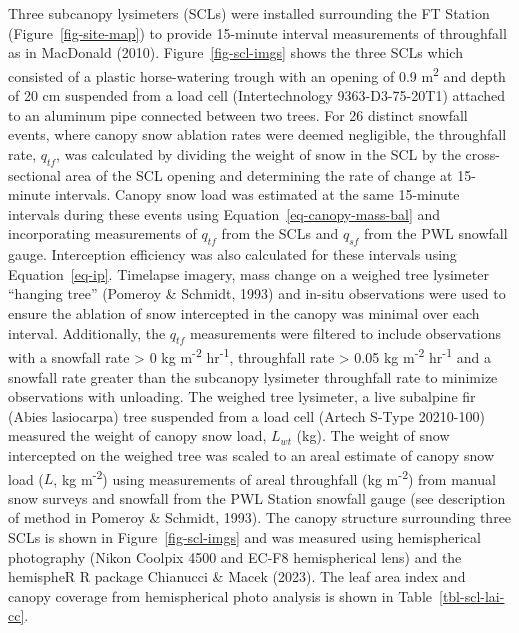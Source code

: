 \documentclass[
  letterpaper,
  DIV=11,
  numbers=noendperiod]{scrartcl}
\begin{document}
Three subcanopy lysimeters (SCLs) were installed surrounding the FT
Station (Figure~\ref{fig-site-map}) to provide 15-minute interval
measurements of throughfall as in MacDonald (2010).
Figure~\ref{fig-scl-imgs} shows the three SCLs which consisted of a
plastic horse-watering trough with an opening of 0.9
m\textsuperscript{2} and depth of 20 cm suspended from a load cell
(Intertechnology 9363-D3-75-20T1) attached to an aluminum pipe connected
between two trees. For 26 distinct snowfall events, where canopy snow
ablation rates were deemed negligible, the throughfall rate, \(q_{tf}\),
was calculated by dividing the weight of snow in the SCL by the
cross-sectional area of the SCL opening and determining the rate of
change at 15-minute intervals. Canopy snow load was estimated at the
same 15-minute intervals during these events using
Equation~\ref{eq-canopy-mass-bal} and incorporating measurements of
\(q_{tf}\) from the SCLs and \(q_{sf}\) from the PWL snowfall gauge.
Interception efficiency was also calculated for these intervals using
Equation~\ref{eq-ip}. Timelapse imagery, mass change on a weighed tree
lysimeter ``hanging tree'' (Pomeroy \& Schmidt, 1993) and in-situ
observations were used to ensure the ablation of snow intercepted in the
canopy was minimal over each interval. Additionally, the \(q_{tf}\)
measurements were filtered to include observations with a snowfall rate
\textgreater{} 0 kg m\textsuperscript{-2} hr\textsuperscript{-1},
throughfall rate \textgreater{} 0.05 kg m\textsuperscript{-2}
hr\textsuperscript{-1} and a snowfall rate greater than the subcanopy
lysimeter throughfall rate to minimize observations with unloading. The
weighed tree lysimeter, a live subalpine fir (Abies lasiocarpa) tree
suspended from a load cell (Artech S-Type 20210-100) measured the weight
of canopy snow load, \(L_{wt}\) (kg). The weight of snow intercepted on
the weighed tree was scaled to an areal estimate of canopy snow load
(\(L\), kg m\textsuperscript{-2}) using measurements of areal
throughfall (kg m\textsuperscript{-2}) from manual snow surveys and
snowfall from the PWL Station snowfall gauge (see description of method
in Pomeroy \& Schmidt, 1993). The canopy structure surrounding three
SCLs is shown in Figure~\ref{fig-scl-imgs} and was measured using
hemispherical photography (Nikon Coolpix 4500 and EC-F8 hemispherical
lens) and the hemispheR R package Chianucci \& Macek (2023). The leaf
area index and canopy coverage from hemispherical photo analysis is
shown in Table~\ref{tbl-scl-lai-cc}.
\end{document}
